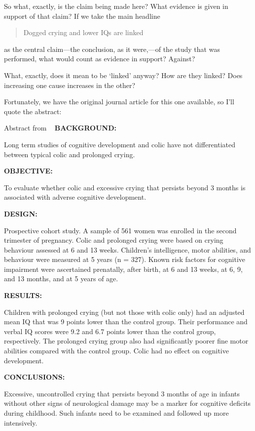 \begin{refsection}
So what, exactly, is the claim being made here? What evidence is given in support of that claim? If we take the main headline

\begin{quote}

Dogged crying and lower IQs are linked
\end{quote}

as the central claim---the conclusion, as it were,---of the study that was performed, what would count as evidence in support? Against? 

What, exactly, does it mean to be `linked' anyway? How are they linked? Does increasing one cause increases in the other?

Fortunately, we have the original journal article for this one available, so I’ll quote the abstract:
\begin{apatextbox}{Abstract from  ~\citep{Rao:2004ku} }
\textbf{BACKGROUND:}

Long term studies of cognitive development and colic have not differentiated between typical colic and prolonged crying.

\textbf{OBJECTIVE:}

To evaluate whether colic and excessive crying that persists beyond 3 months is associated with adverse cognitive development.

\textbf{DESIGN:}

Prospective cohort study. A sample of 561 women was enrolled in the second trimester of pregnancy. Colic and prolonged crying were based on crying behaviour assessed at 6 and 13 weeks. Children's intelligence, motor abilities, and behaviour were measured at 5 years (n = 327). Known risk factors for cognitive impairment were ascertained prenatally, after birth, at 6 and 13 weeks, at 6, 9, and 13 months, and at 5 years of age.

\textbf{RESULTS:}

Children with prolonged crying (but not those with colic only) had an adjusted mean IQ that was 9 points lower than the control group. Their performance and verbal IQ scores were 9.2 and 6.7 points lower than the control group, respectively. The prolonged crying group also had significantly poorer fine motor abilities compared with the control group. Colic had no effect on cognitive development.

\textbf{CONCLUSIONS:}

Excessive, uncontrolled crying that persists beyond 3 months of age in infants without other signs of neurological damage may be a marker for cognitive deficits during childhood. Such infants need to be examined and followed up more intensively.
\end{apatextbox}


\end{refsection}
